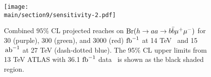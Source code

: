 \begin{figure}[h]
\begin{center}
\texttt{[image: \\main/section9/sensitivity-2.pdf]}
\caption{\small Combined $95\%$ CL projected reaches on ${\mathrm{Br}}(h\to aa \to b\bar{b}\mu^+ \mu^-)$ for 30 (purple), 300 (green), and 3000 (red) ${\rm fb}^{-1}$ at 14 TeV~\cite{Curtin:2014pda} and 15 $\,{\rm ab}^{-1}$ at 27 TeV (dash-dotted blue). The 95\% CL upper limits from  13 TeV ATLAS with 36.1 ${\rm fb}^{-1}$ data~\cite{Aaboud:2018esj} is shown as the black shaded region.}
\label{bbmumu}
\end{center}
\end{figure}


